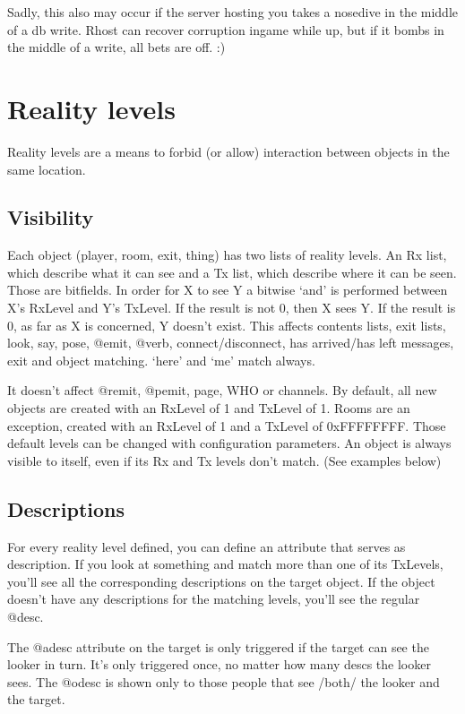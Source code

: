 \documentclass[letterpaper,10pt,english]{sphinxmanual}
\begin{document}
\sphinxAtStartPar
Sadly, this also may occur if the server hosting you takes a nose\sphinxhyphen{}dive in the middle
of a db write.  Rhost can recover corruption in\sphinxhyphen{}game while up, but if it bombs
in the middle of a write, all bets are off. :)


\section{Reality levels}
\label{\detokenize{advanced:reality-levels}}
\sphinxAtStartPar
Reality levels are a means to forbid (or allow) interaction between objects
in the same location.


\subsection{Visibility}
\label{\detokenize{advanced:visibility}}
\sphinxAtStartPar
Each object (player, room, exit, thing) has two lists of reality levels.
An Rx list, which describe what it can see and a Tx list, which describe
where it can be seen. Those are bitfields. In order for X to see Y a bitwise
‘and’ is performed between X’s RxLevel and Y’s TxLevel. If the result is not
0, then X sees Y. If the result is 0, as far as X is concerned, Y doesn’t
exist. This affects contents lists, exit lists, look, say, pose, @emit,
@verb, connect/disconnect, has arrived/has left messages, exit and object
matching. ‘here’ and ‘me’ match always.

\sphinxAtStartPar
It doesn’t affect @remit, @pemit, page, WHO or channels.
By default, all new objects are created with an RxLevel of 1 and TxLevel of
1. Rooms are an exception, created with an RxLevel of 1 and a TxLevel of
0xFFFFFFFF. Those default levels can be changed with configuration
parameters.
An object is always visible to itself, even if its Rx and Tx levels don’t
match. (See examples below)


\subsection{Descriptions}
\label{\detokenize{advanced:descriptions}}
\sphinxAtStartPar
For every reality level defined, you can define an attribute that serves as
description. If you look at something and match more than one of its
TxLevels, you’ll see all the corresponding descriptions on the target
object. If the object doesn’t have any descriptions for the matching levels,
you’ll see the regular @desc.

\sphinxAtStartPar
The @adesc attribute on the target is only triggered if the target can see
the looker in turn. It’s only triggered once, no matter how many descs the
looker sees. The @odesc is shown only to those people that see /both/ the
looker and the target.
\end{document}
